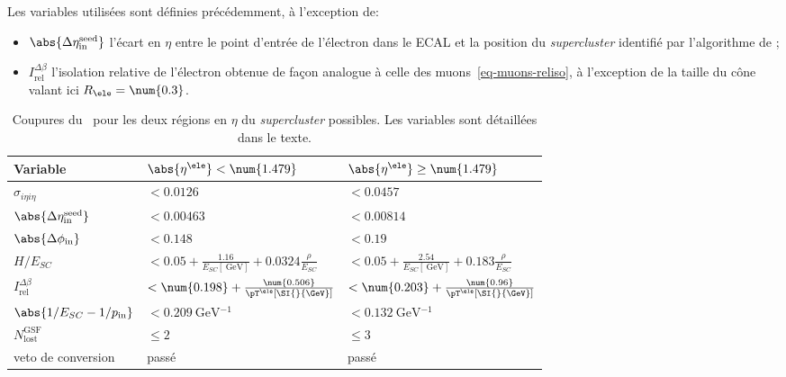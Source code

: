 Les variables utilisées sont définies précédemment, à l'exception de:
\begin{itemize}
\item $\abs{\Delta\eta_\text{in}^\text{seed}}$ l'écart en $\eta$ entre le point d'entrée de l'électron dans le ECAL et la position du \emph{supercluster} identifié par l'algorithme de \PF;
\item $I_\text{rel}^{\Delta\beta}$ l'isolation relative de l'électron obtenue de façon analogue à celle des muons~\eqref{eq-muons-reliso}, à l'exception de la taille du cône valant ici $R_{\ele}=\num{0.3}$.
\end{itemize}
\begin{table}[h]
\centering
\begin{tabular}{lll}
\toprule
Variable & $\abs{\eta^{\ele}} < \num{1.479}$ & $\abs{\eta^{\ele}} \geq \num{1.479}$ \\
\midrule
$\sigma_{i\eta i\eta}$ & $<\num{0.0126}$ & $<\num{0.0457}$ \\
$\abs{\Delta\eta_\text{in}^\text{seed}}$ & $<\num{0.00463}$ & $<\num{0.00814}$ \\
$\abs{\Delta\phi_\text{in}}$ & $<\num{0.148}$ & $<\num{0.19}$ \\
$H/E_{SC}$ & $<\num{0.05}+\frac{\num{1.16}}{E_{SC} [\SI{}{\GeV}]} + \num{0.0324}\frac{\rho}{E_{SC}}$ & $<\num{0.05}+\frac{\num{2.54}}{E_{SC} [\SI{}{\GeV}]} + \num{0.183}\frac{\rho}{E_{SC}}$ \\
$I_\text{rel}^{\Delta\beta}$ & $<\num{0.198} + \frac{\num{0.506}}{\pT^{\ele} [\SI{}{\GeV}]}$ & $<\num{0.203} + \frac{\num{0.96}}{\pT^{\ele} [\SI{}{\GeV}]}$ \\
$\abs{1/E_{SC}-1/p_\text{in}}$ & $<\SI{0.209}{\GeV^{-1}}$ & $<\SI{0.132}{\GeV^{-1}}$ \\
$N_\text{lost}^\text{GSF}$ & $\leq\num{2}$ & $\leq\num{3}$ \\
veto de conversion & passé & passé \\
\bottomrule
\end{tabular}
\caption[Coupures du \CutBasedEleIDVeto.]{Coupures du \CutBasedEleIDVeto\ pour les deux régions en $\eta$ du \emph{supercluster} possibles. Les variables sont détaillées dans le texte.}
\label{tab-CutBasedEleIDVeto}
\end{table}
